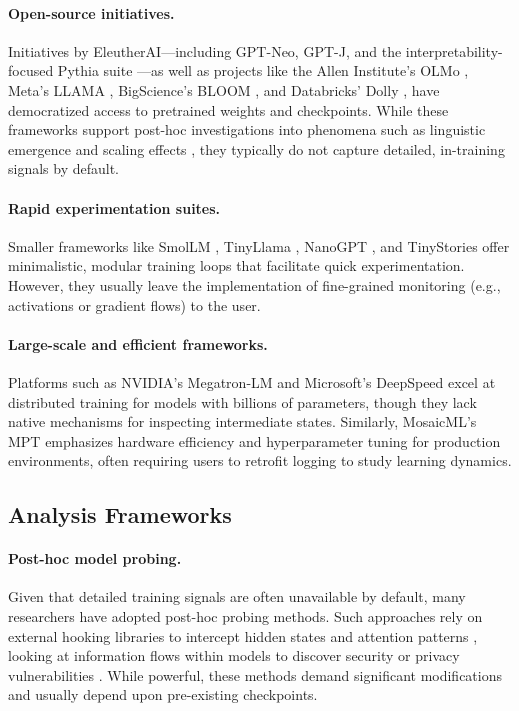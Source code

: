 \paragraph{Open-source initiatives.} Initiatives by EleutherAI—including GPT-Neo, GPT-J, and the interpretability-focused Pythia suite \cite{biderman2023pythia}—as well as projects like the Allen Institute's OLMo \citep{groeneveld2024olmo}, Meta's LLAMA \cite{touvron2023llama}, BigScience's BLOOM \cite{le2023bloom}, and Databricks’ Dolly \cite{databricksdolly2023}, have democratized access to pretrained weights and checkpoints. While these frameworks support post-hoc investigations into phenomena such as linguistic emergence and scaling effects \cite{belrose2023eliciting, gurnee2023finding, michaelov2023emergent, diehlmartinez2024tending}, they typically do not capture detailed, in-training signals by default.

\paragraph{Rapid experimentation suites.} Smaller frameworks like SmolLM \citep{allal2025smollm2}, TinyLlama \citep{zhang2024tinyllama}, NanoGPT \cite{karpathy2023nanogpt},  and TinyStories \cite{eldan2023tinystories} offer minimalistic, modular training loops that facilitate quick experimentation. However, they usually leave the implementation of fine-grained monitoring (e.g., activations or gradient flows) to the user.

\paragraph{Large-scale and efficient frameworks.} Platforms such as NVIDIA's Megatron-LM \cite{narayanan2021megatron} and Microsoft's DeepSpeed \cite{rasley2020deepspeed} excel at distributed training for models with billions of parameters, though they lack native mechanisms for inspecting intermediate states. Similarly, MosaicML’s MPT \cite{mosaic2023mpt} emphasizes hardware efficiency and hyperparameter tuning for production environments, often requiring users to retrofit logging to study learning dynamics.

\subsection{Analysis Frameworks}

\paragraph{Post-hoc model probing.} Given that detailed training signals are often unavailable by default, many researchers have adopted post-hoc probing methods. Such approaches rely on external hooking libraries to intercept hidden states and attention patterns \cite{voita2019analyzing, clark2019does, michel2019sixteen}, looking at information flows within models to discover security or privacy vulnerabilities \cite{yao2024privacysurvey}. While powerful, these methods demand significant modifications and usually depend upon pre-existing checkpoints.%

